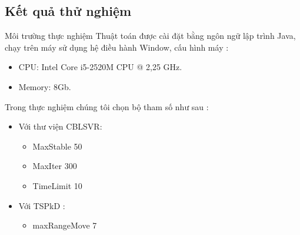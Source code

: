\documentclass[compress]{beamer}
\begin{document}
\subsection{Kết quả thử nghiệm}
\begin{frame}{Môi trường thực nghiệm}
Thuật toán được cài đặt bằng ngôn ngữ lập trình Java, chạy trên máy sử dụng hệ điều hành Window, cấu hình máy :
\begin{itemize}
\item CPU: Intel Core i5-2520M CPU @ 2,25 GHz.
\item Memory: 8Gb.
\end{itemize}
Trong thực nghiệm chúng tôi chọn bộ tham số như sau : 
\begin{itemize}
\item Với thư viện CBLSVR: \begin{itemize}
\item MaxStable 50
\item MaxIter 300
\item TimeLimit 10
\end{itemize}
\item Với TSPkD : \begin{itemize}
\item maxRangeMove 7
\end{itemize}
\end{itemize}
\end{frame}
\end{document}
